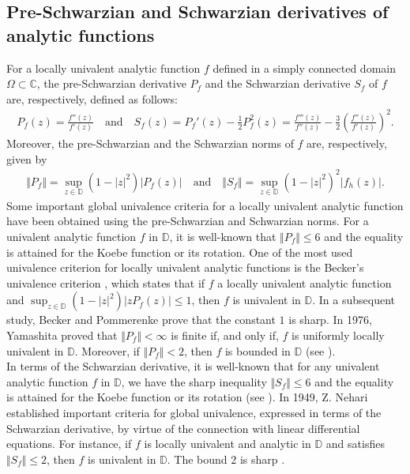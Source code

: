 \documentclass[12pt,reqno]{amsart}
\newtheorem{open problem}{Open problem}[section]
\newcommand{\bea}{\begin{eqnarray}}
\newcommand{\eea}{\end{eqnarray}}
\numberwithin{equation}{section}
\begin{document}
\subsection{Pre-Schwarzian and Schwarzian derivatives of analytic functions}
For a locally univalent analytic function $f$ defined in a simply connected domain $\Omega\subset \mathbb{C}$, the pre-Schwarzian derivative $P_f$ and the Schwarzian derivative $S_f$ of $f$ are, respectively, defined as follows:
\bea\label{c2} P_f(z)=\frac{f''(z)}{f'(z)}\quad\text{and}\quad S_f(z) = P_f'(z)-\frac{1}{2}P_f^2(z)=\frac{f'''(z)}{f''(z)}-\frac{3}{2}\left(\frac{f''(z)}{f'(z)}\right)^2.\eea
Moreover, the pre-Schwarzian and the Schwarzian norms of $f$ are, respectively, given by
\bea\label{r1} \Vert P_f\Vert= \sup_{z \in \mathbb{D}}(1-|z|^2)|P_f(z)|\quad\text{and}\quad \Vert S_f\Vert = \sup_{z \in \mathbb{D}}(1-|z|^2)^2|f_h(z)|.\eea
Some important global univalence criteria for a locally univalent analytic function have been obtained using the pre-Schwarzian and Schwarzian norms.
For a univalent analytic function $f$ in $\mathbb{D}$, it is well-known that $\Vert P_f\Vert\leq 6$ and the equality 
is attained for the Koebe function or its rotation. 
One of the most used univalence criterion for locally univalent analytic functions is the Becker's univalence criterion \cite{B1972}, 
which states that if $f$ a locally univalent analytic function and $\sup_{z\in\mathbb{D}}\left(1-|z|^2\right) \left|zP_f(z)\right|\leq1$, then $f$ is univalent in $\mathbb{D}$. In a subsequent study, 
Becker and Pommerenke \cite{BP1984} prove that the constant $1$ is sharp.
In 1976, Yamashita \cite{Y1976} 
proved that $\Vert P_f \Vert<\infty $ is finite if, and only if, $f$ is uniformly locally univalent in $\mathbb{D}$. Moreover, if $\Vert P_f\Vert<2$, then $f$ is bounded in $\mathbb{D}$ (see \cite{KS2002}).\\[2mm] 
\indent In terms of the Schwarzian derivative, it is well-known that for any univalent analytic function $f$ in $\mathbb{D}$, we have the sharp inequality $\Vert S_f\Vert \leq 6$ and
the equality is attained for the Koebe function or its rotation (see \cite{K1932}). 
In 1949, Z. Nehari \cite{N1949} established important criteria for global univalence, expressed in terms of the Schwarzian derivative, by virtue of the connection with linear differential equations.
For instance, if $f$ is locally univalent and analytic in $\mathbb{D}$ and satisfies $\Vert S_f\Vert \leq2$, then $f$ is univalent in $\mathbb{D}$. The bound $2$ is sharp \cite{H1949}.
\end{document}
